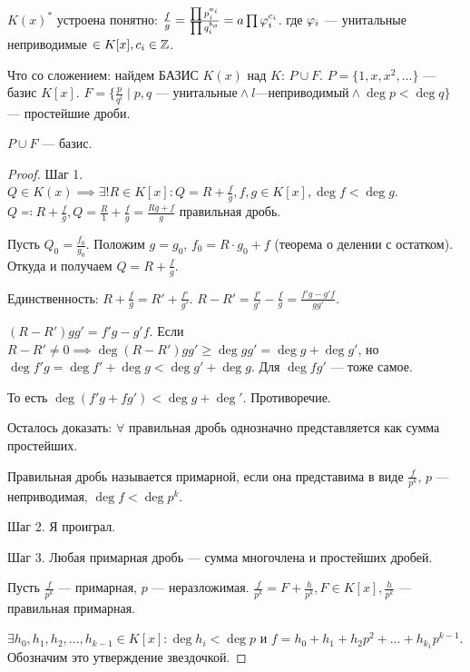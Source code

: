 $K(x)^*$ устроена понятно:  $\frac{f}{g} = \frac{\prod p_i^{a_i}}{\prod q_i^{b_o}} = a \prod \varphi_i^{c_i}$. где $\varphi_i$ --- унитальные неприводимые  $\in K[x], c_i \in \mathbb{Z}$.

Что со сложением: найдем БАЗИС  $K(x)$ над  $K$:  $P \cup F$.  $P = \{1, x, x^2, \ldots\}$ --- базис $K[x]$.  $F = \{ \frac{p}{q^l} \mid p, q\text{ --- унитальные} \land l\text{---неприводимый} \land \deg p < \deg q\}$ --- простейшие дроби.

\begin{theorem}
    $P\cup F$ --- базис.
\end{theorem}
\begin{proof}
    Шаг 1. $Q \in K(x) \implies \exists! R \in K[x]\!: Q = R + \frac{f}{g}, f, g \in K[x], \deg f < \deg g$. $Q \eqqcolon R + \frac{f}{g},Q = \frac{R}{1} + \frac{f}{g} = \frac{Rg+f}{g}$ правильная дробь.

    Пусть $Q_0 = \frac{f_0}{g_0}$. Положим $g = g_0$, $f_0 = R \cdot g_0 +f$ (теорема о делении с остатком). Откуда и получаем $Q = R + \frac{f}{g}$. 

    Единственность: $R + \frac{f}{g} = R' + \frac{f'}{g'}$. $R - R' = \frac{f'}{g'} - \frac{f}{g} = \frac{f'g - g'f}{gg'}$.

    $(R-R')gg' = f'g - g'f$. Если  $R - R' \neq 0 \implies \deg (R-R')gg' \ge \deg gg' = \deg g + \deg g'$, но $\deg f'g = \deg f' + \deg g < \deg g' + \deg g$. Для  $\deg fg'$ --- тоже самое.

    То есть  $\deg (f'g + fg') < \deg g + \deg'$. Противоречие.

    Осталось доказать:  $\forall$ правильная дробь однозначно представляется как сумма простейших. 
     \begin{definition}
        Правильная дробь называется примарной, если она представима в виде $\frac{f}{p^k}$, $p$ --- неприводимая,  $\deg f < \deg p^k$.
    \end{definition}
    
    Шаг 2. Я проиграл.

    Шаг 3. Любая примарная дробь --- сумма многочлена и простейших дробей.

    Пусть $\frac{f}{p^k}$ --- примарная, $p$ --- неразложимая.  $\frac{f}{p^k} = F + \frac{h}{p^k}, F \in K[x], \frac{h}{p^k}$ --- правильная примарная. 

    $\exists h_0, h_1, h_2,\ldots, h_{k-1} \in K[x]\!: \deg h_i < \deg p$ и $f = h_0 + h_1 + h_2p^2 + \ldots + h_{k_1} p^{k-1}$. Обозначим это утверждение звездочкой.


\end{proof}
